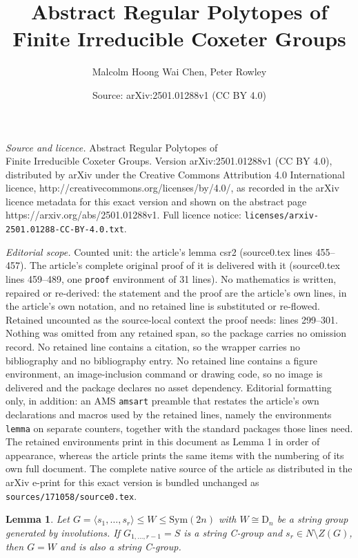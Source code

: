 \documentclass[10pt,a4paper]{amsart}
\title{Abstract Regular Polytopes of \\ Finite Irreducible Coxeter Groups}
\author{Malcolm Hoong Wai Chen, Peter Rowley}
\date{Source: arXiv:2501.01288v1 (CC BY 4.0)}
\newtheorem{lemma}{Lemma}
\begin{document}
\maketitle

\noindent\emph{Source and licence.} Abstract Regular Polytopes of \\ Finite Irreducible Coxeter Groups. Version arXiv:2501.01288v1 (CC BY 4.0), distributed by arXiv under the Creative Commons Attribution 4.0 International licence, http://creativecommons.org/licenses/by/4.0/, as recorded in the arXiv licence metadata for this exact version and shown on the abstract page https://arxiv.org/abs/2501.01288v1. Full licence notice: \texttt{licenses/arxiv-2501.01288-CC-BY-4.0.txt}.\par\smallskip

\noindent\textit{Editorial scope.} Counted unit: the article's lemma csr2 (source0.tex lines 455--457). The article's complete original proof of it is delivered with it (source0.tex lines 459--489, one \texttt{proof} environment of 31 lines). No mathematics is written, repaired or re-derived: the statement and the proof are the article's own lines, in the article's own notation, and no retained line is substituted or re-flowed.  Retained uncounted as the source-local context the proof needs: lines 299--301.  Nothing was omitted from any retained span, so the package carries no omission record.  No retained line contains a citation, so the wrapper carries no bibliography and no bibliography entry.  No retained line contains a figure environment, an image-inclusion command or drawing code, so no image is delivered and the package declares no asset dependency.  Editorial formatting only, in addition: an AMS \texttt{amsart} preamble that restates the article's own declarations and macros used by the retained lines, namely the environments \texttt{lemma} on separate counters, together with the standard packages those lines need.  The retained environments print in this document as Lemma 1 in order of appearance, whereas the article prints the same items with the numbering of its own full document.  The complete native source of the article as distributed in the arXiv e-print for this exact version is bundled unchanged as \texttt{sources/171058/source0.tex}.
\begin{lemma} \label{ipdn}
Let $G=\langle s_1,\dots, s_r\rangle \leq W \leq \mathrm{Sym}(2n)$ with $W \cong \mathrm{D}_n$ be a string group generated by involutions. If $G_{1,\dots,r-1}=S$ is a string C-group and $s_r \in N \setminus Z(G)$, then $G=W$ and is also a string C-group.
\end{lemma}
\end{document}
